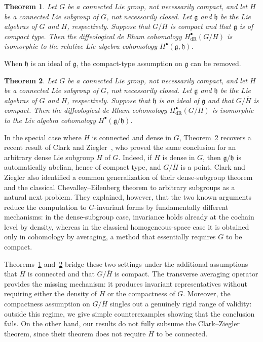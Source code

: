 \documentclass[reqno, 11pt]{amsart}
\newtheorem{thm}{Theorem}[section]
\theoremstyle{definition}
\theoremstyle{property}
\theoremstyle{remark}
\numberwithin{equation}{section}
\begin{document}
\begin{thm}\label{thm:GH1}
Let $G$ be a connected Lie group, not necessarily compact, and let $H$ be a connected Lie subgroup of $G$, not necessarily closed. Let $\mathfrak g$ and $\mathfrak h$ be the Lie algebras of $G$ and $H$, respectively. Suppose that $G/\overline{H}$ is compact and that $\mathfrak g$ is of compact type. Then the diffeological de Rham cohomology $H^\bullet_{\mathrm{dR}}(G/H)$ is isomorphic to the relative Lie algebra cohomology $H^\bullet(\mathfrak g,\mathfrak h)$.
\end{thm}

When $\mathfrak h$ is an ideal of $\mathfrak g$, the compact-type assumption
on $\mathfrak g$ can be removed.

\begin{thm}\label{thm:GH}
Let $G$ be a connected Lie group, not necessarily compact, and let $H$ be a connected Lie subgroup of $G$, not necessarily closed. Let $\mathfrak g$ and $\mathfrak h$ be the Lie algebras of $G$ and $H$, respectively. Suppose that $\mathfrak h$ is an ideal of $\mathfrak g$ and that $G/\overline{H}$ is compact. Then the diffeological de Rham cohomology $H^\bullet_{\mathrm{dR}}(G/H)$ is isomorphic to the Lie algebra cohomology $H^\bullet(\mathfrak g/\mathfrak h)$.
\end{thm}

In the special case where $H$ is connected and dense in $G$,
Theorem~\ref{thm:GH} recovers a recent result of Clark and
Ziegler~\cite{CZ26}, who proved the same conclusion for an arbitrary dense Lie
subgroup $H$ of $G$. Indeed, if $H$ is dense in $G$, then
$\mathfrak g/\mathfrak h$ is automatically abelian, hence of compact type,
and $G/\overline{H}$ is a point.  Clark and Ziegler also identified a common 
generalization of their
dense-subgroup theorem and the classical Chevalley--Eilenberg theorem to
arbitrary subgroups as a natural next problem. They explained, however, that
the two known arguments reduce the computation to $G$-invariant forms by
fundamentally different mechanisms: in the dense-subgroup case, invariance
holds already at the cochain level by density, whereas in the classical
homogeneous-space case it is obtained only in cohomology by averaging, a
method that essentially requires $G$ to be compact.

Theorems~\ref{thm:GH1} and~\ref{thm:GH} bridge these two settings under the
additional assumptions that $H$ is connected and that $G/\overline H$ is
compact. The transverse averaging operator provides the missing mechanism: it
produces invariant representatives without requiring either the density of
$H$ or the compactness of $G$. Moreover, the compactness assumption on
$G/\overline H$ singles out a genuinely rigid range of validity: outside this
regime, we give simple counterexamples showing that the conclusion fails. On
the other hand, our results do not fully subsume the Clark--Ziegler theorem,
since their theorem does not require $H$ to be connected.
\end{document}
